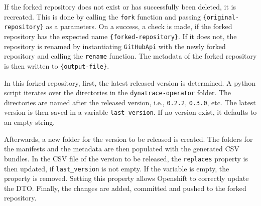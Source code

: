 \pagebreak

If the forked repository does not exist or has successfully been deleted, it is recreated.
This is done by calling the \verb|fork| function and passing \verb|{original-repository}| as a parameters.
On a success, a check is made, if the forked repository has the expected name \verb|{forked-repository}|.
If it does not, the repository is renamed by instantiating \verb|GitHubApi| with the newly forked repository and calling the \verb|rename| function.
The metadata of the forked repository is then written to \verb|{output-file}|.

In this forked repository, first, the latest released version is determined.
A python script iterates over the directories in the \verb|dynatrace-operator| folder.
The directories are named after the released version, i.e., \verb|0.2.2|, \verb|0.3.0|, etc.
The latest version is then saved in a variable \verb|last_version|.
If no version exist, it defaults to an empty string.

Afterwards, a new folder for the version to be released is created.
The folders for the manifests and the metadata are then populated with the generated CSV bundles.
In the CSV file of the version to be released, the \verb|replaces| property is then updated, if \verb|last_version| is not empty.
If the variable is empty, the property is removed.
Setting this property allows Openshift to correctly update the DTO.
Finally, the changes are added, committed and pushed to the forked repository.
